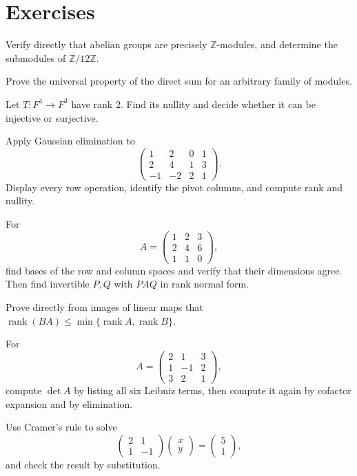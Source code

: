 \section*{Exercises}
\begin{exercise}[Basic] Verify directly that abelian groups are precisely
\(\mathbb Z\)-modules, and determine the submodules of
\(\mathbb Z/12\mathbb Z\).\end{exercise}
\begin{exercise}[Core] Prove the universal property of the direct sum for an
arbitrary family of modules.\end{exercise}
\begin{exercise}[Core] Let \(T:F^4\to F^3\) have rank \(2\). Find its
nullity and decide whether it can be injective or surjective.\end{exercise}
\begin{exercise}[Core] Apply Gaussian elimination to
\[
\begin{pmatrix}1&2&0&1\\2&4&1&3\\-1&-2&2&1\end{pmatrix}.
\]
Display every row operation, identify the pivot columns, and compute rank and
nullity.\end{exercise}
\begin{exercise}[Core] For
\[
A=\begin{pmatrix}1&2&3\\2&4&6\\1&1&0\end{pmatrix},
\]
find bases of the row and column spaces and verify that their dimensions
agree.  Then find invertible \(P,Q\) with \(PAQ\) in rank normal form.
\end{exercise}
\begin{exercise}[Core] Prove directly from images of linear maps that
\(\operatorname{rank}(BA)\leq
\min\{\operatorname{rank}A,\operatorname{rank}B\}\).\end{exercise}
\begin{exercise}[Core] For
\[
A=\begin{pmatrix}2&1&3\\1&-1&2\\3&2&1\end{pmatrix},
\]
compute \(\det A\) by listing all six Leibniz terms, then compute it again by
cofactor expansion and by elimination.\end{exercise}
\begin{exercise}[Core] Use Cramer's rule to solve
\[
\begin{pmatrix}2&1\\1&-1\end{pmatrix}
\begin{pmatrix}x\\y\end{pmatrix}
=\begin{pmatrix}5\\1\end{pmatrix},
\]
and check the result by substitution.\end{exercise}
